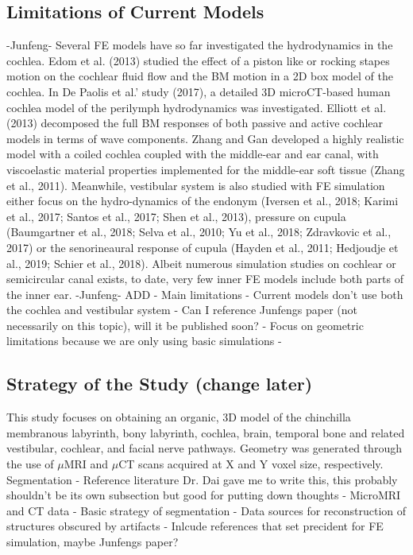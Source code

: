 \documentclass[12pt]{article}
\begin{document}
\subsection{Limitations of Current Models}
-Junfeng- \newline
Several FE models have so far investigated the hydrodynamics in the cochlea. Edom et al. (2013) studied the effect of a piston like or rocking stapes motion on the cochlear fluid flow and the BM motion in a 2D box model of the cochlea. In De Paolis et al.’ study (2017), a detailed 3D microCT-based human cochlea model of the perilymph hydrodynamics was investigated. Elliott et al. (2013) decomposed the full BM responses of both passive and active cochlear models in terms of wave components. Zhang and Gan developed a highly realistic model with a coiled cochlea coupled with the middle-ear and ear canal, with viscoelastic material properties implemented for the middle-ear soft tissue (Zhang et al., 2011). Meanwhile, vestibular system is also studied with FE simulation either focus on the hydro-dynamics of the endonym (Iversen et al., 2018; Karimi et al., 2017; Santos et al., 2017; Shen et al., 2013), pressure on cupula (Baumgartner et al., 2018; Selva et al., 2010; Yu et al., 2018; Zdravkovic et al., 2017) or the senorineaural response of cupula (Hayden et al., 2011; Hedjoudje et al., 2019; Schier et al., 2018). Albeit numerous simulation studies on cochlear or semicircular canal exists, to date, very few inner FE models include both parts of the inner ear. \newline
-Junfeng-
ADD
- Main limitations
- Current models don't use both the cochlea and vestibular system
- Can I reference Junfengs paper (not necessarily on this topic), will it be published soon?
- Focus on geometric limitations because we are only using basic simulations
-


\subsection{Strategy of the Study (change later)}
This study focuses on obtaining an organic, 3D model of the chinchilla membranous labyrinth, bony labyrinth, cochlea, brain, temporal bone and related vestibular, cochlear, and facial nerve pathways. Geometry was generated through the use of $\mu$MRI and $\mu$CT scans acquired at X and Y voxel size, respectively. Segmentation 
- Reference literature Dr. Dai gave me to write this, this probably shouldn't be its own subsection but good for putting down thoughts
-  MicroMRI and CT data
-  Basic strategy of segmentation
-  Data sources for reconstruction of structures obscured by artifacts
-  Inlcude references that set precident for FE simulation, maybe Junfengs paper?
\end{document}
